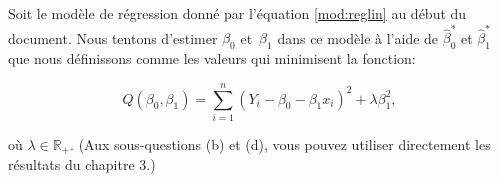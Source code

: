 \begin{questions}
\begin{solution}
\end{solution}







\question

Soit le modèle de régression donné par l'équation \eqref{mod:reglin} au début du document. Nous tentons d'estimer $\beta_0$ et~$\beta_1$ dans ce modèle à l'aide de $\widehat{\beta}_0^*$ et $\widehat{\beta}_1^*$ que nous définissons comme les valeurs qui minimisent la fonction:

\begin{equation*}
   Q(\beta_0, \beta_1)= \sum_{i=1}^n(Y_i-\beta_0- \beta_1x_i)^2 + \lambda \beta_1 ^2,
\end{equation*}

où $\lambda \in \mathbb{R}_+$. (Aux sous-questions (b) et (d), vous pouvez utiliser directement  les résultats du chapitre 3.)
\begin{parts}

\end{parts}
\end{questions}

